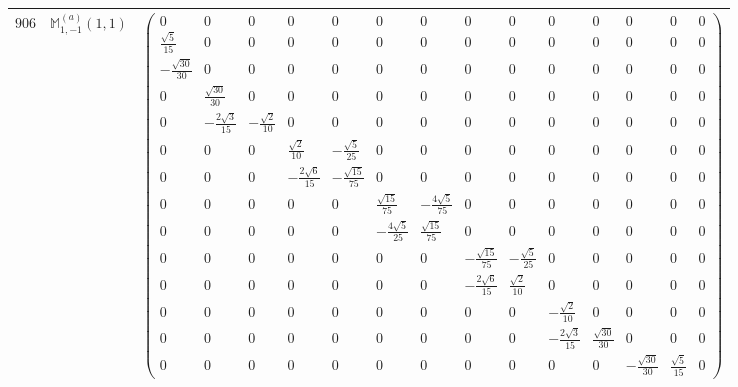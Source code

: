 \documentclass[fleqn,8pt,landscape]{jsarticle}
\begin{document}
\begin{center}
\begin{longtable}{ccc}
$ 906 $ & $ \mathbb{M}_{1,-1}^{(a)}(1,1) $ & $ \begin{pmatrix} 0 & 0 & 0 & 0 & 0 & 0 & 0 & 0 & 0 & 0 & 0 & 0 & 0 & 0 \\ \frac{\sqrt{5}}{15} & 0 & 0 & 0 & 0 & 0 & 0 & 0 & 0 & 0 & 0 & 0 & 0 & 0 \\ - \frac{\sqrt{30}}{30} & 0 & 0 & 0 & 0 & 0 & 0 & 0 & 0 & 0 & 0 & 0 & 0 & 0 \\ 0 & \frac{\sqrt{30}}{30} & 0 & 0 & 0 & 0 & 0 & 0 & 0 & 0 & 0 & 0 & 0 & 0 \\ 0 & - \frac{2 \sqrt{3}}{15} & - \frac{\sqrt{2}}{10} & 0 & 0 & 0 & 0 & 0 & 0 & 0 & 0 & 0 & 0 & 0 \\ 0 & 0 & 0 & \frac{\sqrt{2}}{10} & - \frac{\sqrt{5}}{25} & 0 & 0 & 0 & 0 & 0 & 0 & 0 & 0 & 0 \\ 0 & 0 & 0 & - \frac{2 \sqrt{6}}{15} & - \frac{\sqrt{15}}{75} & 0 & 0 & 0 & 0 & 0 & 0 & 0 & 0 & 0 \\ 0 & 0 & 0 & 0 & 0 & \frac{\sqrt{15}}{75} & - \frac{4 \sqrt{5}}{75} & 0 & 0 & 0 & 0 & 0 & 0 & 0 \\ 0 & 0 & 0 & 0 & 0 & - \frac{4 \sqrt{5}}{25} & \frac{\sqrt{15}}{75} & 0 & 0 & 0 & 0 & 0 & 0 & 0 \\ 0 & 0 & 0 & 0 & 0 & 0 & 0 & - \frac{\sqrt{15}}{75} & - \frac{\sqrt{5}}{25} & 0 & 0 & 0 & 0 & 0 \\ 0 & 0 & 0 & 0 & 0 & 0 & 0 & - \frac{2 \sqrt{6}}{15} & \frac{\sqrt{2}}{10} & 0 & 0 & 0 & 0 & 0 \\ 0 & 0 & 0 & 0 & 0 & 0 & 0 & 0 & 0 & - \frac{\sqrt{2}}{10} & 0 & 0 & 0 & 0 \\ 0 & 0 & 0 & 0 & 0 & 0 & 0 & 0 & 0 & - \frac{2 \sqrt{3}}{15} & \frac{\sqrt{30}}{30} & 0 & 0 & 0 \\ 0 & 0 & 0 & 0 & 0 & 0 & 0 & 0 & 0 & 0 & 0 & - \frac{\sqrt{30}}{30} & \frac{\sqrt{5}}{15} & 0 \end{pmatrix} $ \\ \hline

\end{longtable}
\end{center}
\end{document}
